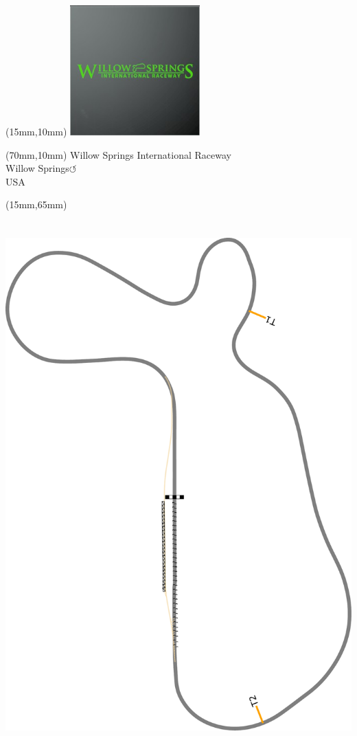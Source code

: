 \null\newpage
\begin{textblock*}{50mm}(15mm,10mm)%
\includegraphics[width=50mm]{LG/2015-05-20_00098.png}
\end{textblock*}
\begin{textblock*}{130mm}(70mm,10mm)%
{\fontsize{20}{20}\selectfont Willow Springs International Raceway\\}
{\fontsize{16}{16}\selectfont Willow Springs\hfill \huge$\circlearrowleft$\\}
{\fontsize{12}{12}\selectfont USA\\}
\end{textblock*}
\begin{textblock*}{185mm}(15mm,65mm)%
\centering
\mbox{\includegraphics[width=185mm,height=210mm,keepaspectratio]{PT/WSPIR.pdf}}
\end{textblock*}

